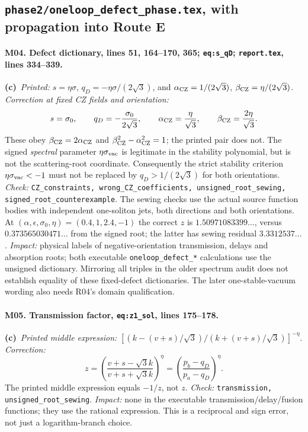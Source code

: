 \documentclass[11pt,a4paper]{article}
\newcommand{\C}{\textbf{(c)}\ }
\newcommand{\file}[1]{\nolinkurl{#1}}
\newcommand{\test}[1]{\textit{Check:} \file{#1}.}
\begin{document}
\subsection{\file{phase2/oneloop_defect_phase.tex}, with propagation into Route E}
\paragraph{M04. Defect dictionary, lines 51, 164--170, 365; \file{eq:s_qD}; \file{report.tex}, lines 334--339.}
\C \textit{Printed:} $s=\eta\sigma$, $q_D=-\eta\sigma/(2\sqrt3)$,
and $\alpha_{\rm CZ}=1/(2\sqrt3)$, $\beta_{\rm CZ}=\eta/(2\sqrt3)$.
\textit{Correction at fixed CZ fields and orientation:}
\[
 s=\sigma_0,\qquad q_D=-\frac{\sigma_0}{2\sqrt3},\qquad
 \alpha_{\rm CZ}=\frac\eta{\sqrt3},\qquad
 \beta_{\rm CZ}=\frac{2\eta}{\sqrt3}.
\]
These obey $\beta_{\rm CZ}=2\alpha_{\rm CZ}$ and
$\beta_{\rm CZ}^2-\alpha_{\rm CZ}^2=1$; the printed pair does not.
The signed \emph{spectral} parameter $\eta\sigma_{\rm vac}$ is legitimate
in the stability polynomial, but is not the scattering-root coordinate.
Consequently the strict stability criterion $\eta\sigma_{\rm vac}<-1$
must not be replaced by $q_D>1/(2\sqrt3)$ for both orientations.
\test{CZ_constraints, wrong_CZ_coefficients, unsigned_root_sewing, signed_root_counterexample}
The sewing checks use the actual source function bodies with independent
one-soliton jets, both directions and both orientations.
At $(\alpha,\epsilon,\sigma_0,\eta)=(0.4,1,2.4,-1)$ the correct $z$ is
$1.50971083399\ldots$, versus $0.373565030471\ldots$ from the signed root;
the latter has sewing residual $3.3312537\ldots$.
\textit{Impact:} physical labels of negative-orientation transmission,
delays and absorption roots; both executable \file{oneloop_defect_*}
calculations use the unsigned dictionary. Mirroring all triples in the older
spectrum audit does not establish equality of these fixed-defect dictionaries.
The later one-stable-vacuum wording also needs R04's domain qualification.

\paragraph{M05. Transmission factor, \file{eq:z1_sol}, lines 175--178.}
\C \textit{Printed middle expression:}
$[(k-(v+s)/\sqrt3)/(k+(v+s)/\sqrt3)]^{-\eta}$.
\textit{Correction:}
\[
 z=\left(\frac{v+s-\sqrt3 k}{v+s+\sqrt3 k}\right)^\eta
  =\left(\frac{p_b-q_D}{p_a-q_D}\right)^\eta.
\]
The printed middle expression equals $-1/z$, not $z$.
\test{transmission, unsigned_root_sewing}
\textit{Impact:} none in the executable transmission/delay/fusion functions;
they use the rational expression. This is a reciprocal and sign error,
not just a logarithm-branch choice.
\end{document}
